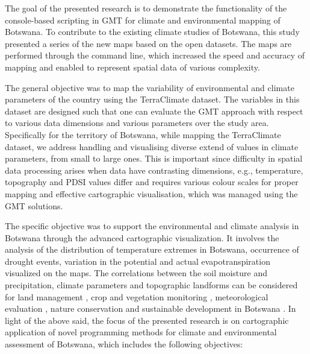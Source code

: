 \documentclass[ijgi,article,submit,pdftex,moreauthors]{Definitions/mdpi}
\begin{document}
The goal of the presented research is to demonstrate the functionality of the console-based scripting in GMT for climate and environmental mapping of Botswana. To contribute to the existing climate studies of Botswana, this study presented a series of the new maps based on the open datasets. The maps are performed through the command line, which increased the speed and accuracy of mapping and enabled to represent spatial data of various complexity. 

The general objective was to map the variability of environmental and climate parameters of the country using the TerraClimate dataset. The variables in this dataset are designed such that one can evaluate the GMT approach with respect to various data dimensions and various parameters over the study area. Specifically for the territory of Botswana, while mapping the TerraClimate dataset, we address handling and visualising diverse extend of values in climate parameters, from small to large ones. This is important since difficulty in spatial data processing arises when data have contrasting dimensions, e.g., temperature, topography and PDSI values differ and requires various colour scales for proper mapping and effective cartographic visualisation, which was managed using the GMT solutions.

The specific objective was to support the environmental and climate analysis in Botswana through the advanced cartographic visualization. It involves the analysis of the distribution of temperature extremes in Botswana, occurrence of drought events, variation in the potential and actual evapotranspiration visualized on the maps. The correlations between the soil moisture and precipitation, climate parameters and topographic landforms can be considered for land management \cite{REED2010149,Jovanovic,Basupi2017,Mfundisi}, crop and vegetation monitoring \cite{9792979,Tsheboeng}, meteorological evaluation \cite{Moses2019}, nature conservation and sustainable development in Botswana \cite{Mogome,Lange}. In light of the above said, the focus of the presented research is on cartographic application of novel programming methods for climate and environmental assessment of Botswana, which includes the following objectives:
\end{document}
